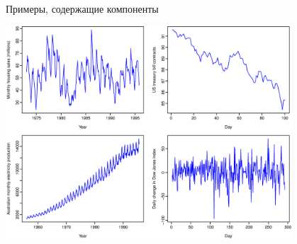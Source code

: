 \documentclass[10pt,pdf,utf8,hyperref={unicode},aspectratio=169]{beamer}
\begin{document}
\begin{frame}{Примеры, содержащие компоненты}
\begin{center}
			\includegraphics[width=0.8\textwidth]{decomp1.png}
		\end{center}		
\end{frame}
\end{document}

